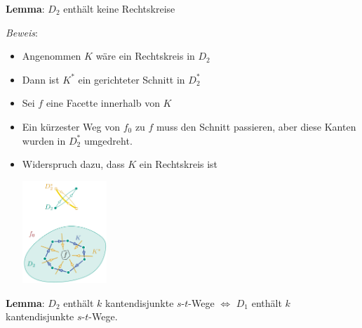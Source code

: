 \textbf{Lemma}: $D_2$ enthält keine Rechtskreise

\textit{Beweis}: 
\begin{itemize}
	\item Angenommen $K$ wäre ein Rechtskreis in $D_2$
	\item Dann ist $K^*$ ein gerichteter Schnitt in $D_2^*$
	\item Sei $f$ eine Facette innerhalb von $K$
	\item Ein kürzester Weg von $f_0$ zu $f$ muss den Schnitt passieren, aber diese Kanten wurden in $D_2^*$ umgedreht.
	\item Widerspruch dazu, dass $K$ ein Rechtskreis ist
	\begin{center}
		\includegraphics[width=0.25\textwidth]{images/menger-4.png}
	\end{center}
\end{itemize}

\textbf{Lemma}: $D_2$ enthält $k$ kantendisjunkte $s$-$t$-Wege $\iff$ $D_1$ enthält $k$ kantendisjunkte $s$-$t$-Wege.

